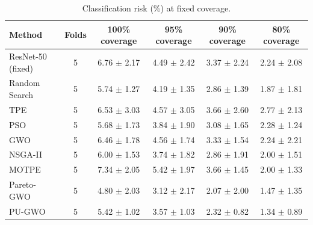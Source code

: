 \begin{table}[t]
\centering
\caption{Classification risk (\%) at fixed coverage.}
\label{tab:table5_risk_at_coverage}
\small
\begin{tabular}{lccccc}
\toprule
Method & Folds & 100\% coverage & 95\% coverage & 90\% coverage & 80\% coverage \\
\midrule
ResNet-50 (fixed) & 5 & 6.76 $\pm$ 2.17 & 4.49 $\pm$ 2.42 & 3.37 $\pm$ 2.24 & 2.24 $\pm$ 2.08 \\
Random Search & 5 & 5.74 $\pm$ 1.27 & 4.19 $\pm$ 1.35 & 2.86 $\pm$ 1.39 & 1.87 $\pm$ 1.81 \\
TPE & 5 & 6.53 $\pm$ 3.03 & 4.57 $\pm$ 3.05 & 3.66 $\pm$ 2.60 & 2.77 $\pm$ 2.13 \\
PSO & 5 & 5.68 $\pm$ 1.73 & 3.84 $\pm$ 1.90 & 3.08 $\pm$ 1.65 & 2.28 $\pm$ 1.24 \\
GWO & 5 & 6.46 $\pm$ 1.78 & 4.56 $\pm$ 1.74 & 3.33 $\pm$ 1.54 & 2.24 $\pm$ 2.21 \\
NSGA-II & 5 & 6.00 $\pm$ 1.53 & 3.74 $\pm$ 1.82 & 2.86 $\pm$ 1.91 & 2.00 $\pm$ 1.51 \\
MOTPE & 5 & 7.34 $\pm$ 2.05 & 5.42 $\pm$ 1.97 & 3.66 $\pm$ 1.45 & 2.00 $\pm$ 1.33 \\
Pareto-GWO & 5 & 4.80 $\pm$ 2.03 & 3.12 $\pm$ 2.17 & 2.07 $\pm$ 2.00 & 1.47 $\pm$ 1.35 \\
PU-GWO & 5 & 5.42 $\pm$ 1.02 & 3.57 $\pm$ 1.03 & 2.32 $\pm$ 0.82 & 1.34 $\pm$ 0.89 \\
\bottomrule
\end{tabular}
\end{table}
